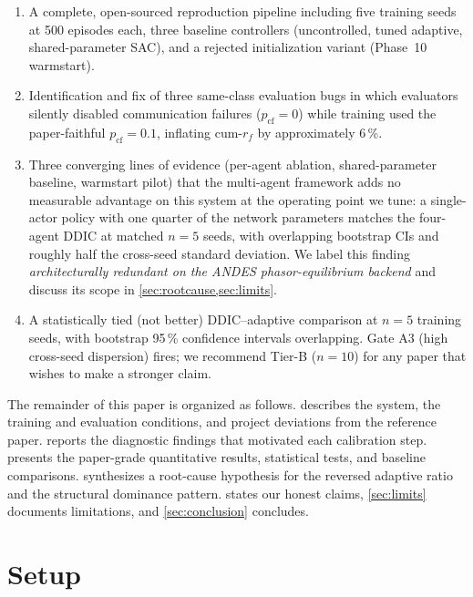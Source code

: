 \documentclass[journal,onecolumn,11pt]{IEEEtran}
\begin{document}
\begin{enumerate}
  \item A complete, open-sourced reproduction pipeline including
        five training seeds at 500 episodes each, three baseline
        controllers (uncontrolled, tuned adaptive, shared-parameter
        SAC), and a rejected initialization variant
        (Phase~10 warmstart).
  \item Identification and fix of three same-class evaluation bugs in
        which evaluators silently disabled communication failures
        ($p_{\text{cf}} = 0$) while training used the paper-faithful
        $p_{\text{cf}} = 0.1$, inflating cum-$r_f$ by approximately
        6\,\%.
  \item Three converging lines of evidence
        (per-agent ablation, shared-parameter baseline, warmstart
        pilot) that the multi-agent framework adds no measurable
        advantage on this system at the operating point we tune:
        a single-actor policy with one quarter of the network
        parameters matches the four-agent DDIC at matched $n = 5$
        seeds, with overlapping bootstrap CIs and roughly half the
        cross-seed standard deviation. We label this finding
        \emph{architecturally redundant on the ANDES phasor-equilibrium
        backend} and discuss its scope in
        \cref{sec:rootcause,sec:limits}.
  \item A statistically tied (not better) DDIC--adaptive comparison at
        $n = 5$ training seeds, with bootstrap 95\,\% confidence
        intervals overlapping. Gate A3 (high cross-seed dispersion)
        fires; we recommend Tier-B ($n = 10$) for any paper that wishes
        to make a stronger claim.
\end{enumerate}

The remainder of this paper is organized as follows.
 describes the system, the training and evaluation
conditions, and project deviations from the reference paper.
 reports the diagnostic findings that motivated
each calibration step.  presents the paper-grade
quantitative results, statistical tests, and baseline comparisons.
 synthesizes a root-cause hypothesis for the
reversed adaptive ratio and the structural dominance pattern.
 states our honest claims, \cref{sec:limits}
documents limitations, and \cref{sec:conclusion} concludes.

\section{Setup}\label{sec:setup}
\end{document}
